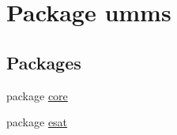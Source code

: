 \hypertarget{namespaceumms}{\section{Package umms}
\label{namespaceumms}
}
\subsection*{Packages}
\begin{DoxyCompactItemize}
\item 
package \hyperlink{namespaceumms_1_1core}{core}
\item 
package \hyperlink{namespaceumms_1_1esat}{esat}
\end{DoxyCompactItemize}
